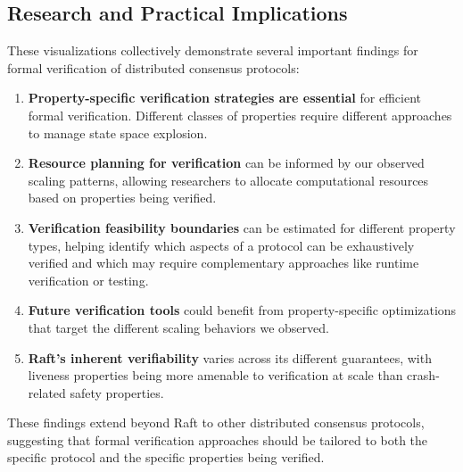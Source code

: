 \subsection{Research and Practical Implications}

These visualizations collectively demonstrate several important findings for formal verification of distributed consensus protocols:

\begin{enumerate}
    \item \textbf{Property-specific verification strategies are essential} for efficient formal verification. Different classes of properties require different approaches to manage state space explosion.
    
    \item \textbf{Resource planning for verification} can be informed by our observed scaling patterns, allowing researchers to allocate computational resources based on properties being verified.
    
    \item \textbf{Verification feasibility boundaries} can be estimated for different property types, helping identify which aspects of a protocol can be exhaustively verified and which may require complementary approaches like runtime verification or testing.
    
    \item \textbf{Future verification tools} could benefit from property-specific optimizations that target the different scaling behaviors we observed.
    
    \item \textbf{Raft's inherent verifiability} varies across its different guarantees, with liveness properties being more amenable to verification at scale than crash-related safety properties.
\end{enumerate}

These findings extend beyond Raft to other distributed consensus protocols, suggesting that formal verification approaches should be tailored to both the specific protocol and the specific properties being verified. 